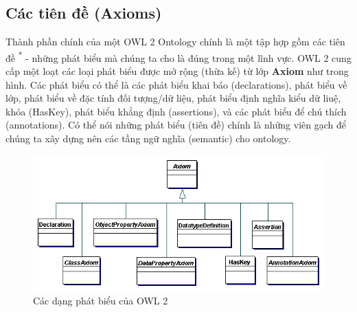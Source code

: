 \subsection{Các tiên đề (Axioms)}
{\let\thefootnote\relax{}
}
Thành phần chính của một OWL 2 Ontology chính là một tập hợp gồm các tiên đề \textsuperscript{*} - những phát biểu mà chúng ta cho là đúng trong một lĩnh vực. OWL 2 cung cấp một loạt các loại phát biểu được mở rộng (thừa kế) từ lớp \textbf{Axiom} như trong hình. Các phát biểu có thể là các phát biểu khai báo (declarations), phát biểu về lớp, phát biểu về đặc tính đối tượng/dữ liệu, phát biểu định nghĩa kiểu dữ liuệ, khóa (HasKey), phát biểu khẳng định (assertions), và các phát biểu để chú thích (annotations). Có thể nói những phát biểu (tiên đề) chính là những viên gạch để chúng ta xây dựng nên các tầng ngữ nghĩa (semantic) cho ontology.
\begin{figure}[h]
	\centering
	\includegraphics[width=120mm]{Figures/axioms.png}
	\caption{Các dạng phát biểu của OWL 2\label{overflow}}
\end{figure}

